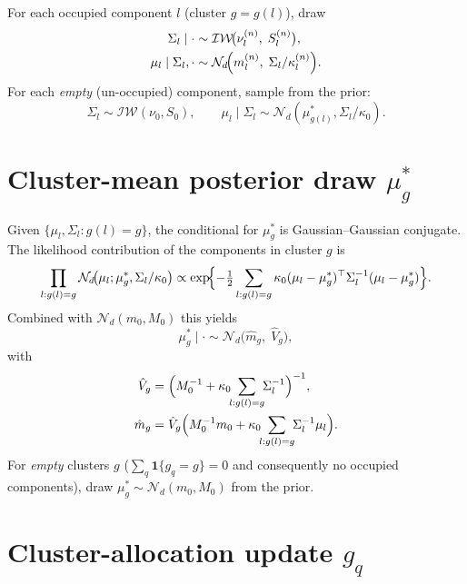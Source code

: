 \documentclass[11pt]{article}
\newcommand{\ind}{\mathbf{1}}
\newcommand{\trans}{^{\top}}
\newcommand{\IW}{\mathcal{IW}}
\begin{document}
For each occupied component $l$ (cluster $g=g(l)$), draw
\begin{align}
\Sigma_l \mid \cdot &\sim \IW\!\bigl(\nu_l^{(n)},\;S_l^{(n)}\bigr),\label{eq:Sig-draw}\\
\mu_l \mid \Sigma_l,\cdot &\sim \mathcal{N}_d\!\Bigl(m_l^{(n)},\;\Sigma_l/\kappa_l^{(n)}\Bigr).
\label{eq:mu-draw}
\end{align}
For each \emph{empty} (un-occupied) component, sample from the prior:
\begin{equation}
\Sigma_l\sim\IW(\nu_0,S_0),\qquad
\mu_l\mid\Sigma_l\sim\mathcal{N}_d(\mu_{g(l)}^*,\Sigma_l/\kappa_0).
\label{eq:emptydraw}
\end{equation}

\section{Cluster-mean posterior draw $\mu_g^*$}
\label{sec:mustar-update}

Given $\{\mu_l,\Sigma_l:g(l)=g\}$, the conditional for $\mu_g^*$ is
Gaussian--Gaussian conjugate. The likelihood contribution of the
components in cluster $g$ is
\begin{equation}
\prod_{l:g(l)=g}\mathcal{N}_d\!\bigl(\mu_l;\mu_g^*,\Sigma_l/\kappa_0\bigr)
\propto
\exp\!\Bigl\{-\tfrac{1}{2}\sum_{l:g(l)=g}
 \kappa_0(\mu_l-\mu_g^*)\trans\Sigma_l^{-1}(\mu_l-\mu_g^*)\Bigr\}.
\label{eq:mustar-lik}
\end{equation}
Combined with $\mathcal{N}_d(m_0,M_0)$ this yields
\begin{equation}
\mu_g^*\mid\cdot \sim \mathcal{N}_d\!\bigl(\hat m_g,\;\hat V_g\bigr),
\label{eq:mustar-post}
\end{equation}
with
\begin{align}
\hat V_g &=\Bigl(M_0^{-1}+\kappa_0\!\!\sum_{l:g(l)=g}\!\!\Sigma_l^{-1}\Bigr)^{-1},
   \label{eq:Vhat}\\
\hat m_g &=\hat V_g\Bigl(M_0^{-1}m_0
   +\kappa_0\!\!\sum_{l:g(l)=g}\!\!\Sigma_l^{-1}\mu_l\Bigr).
   \label{eq:mhat}
\end{align}
For \emph{empty} clusters $g$ ($\sum_q\ind\{g_q=g\}=0$ and consequently
no occupied components), draw $\mu_g^*\sim\mathcal{N}_d(m_0,M_0)$ from
the prior.

\section{Cluster-allocation update $g_q$}
\label{sec:gupdate}
\end{document}
